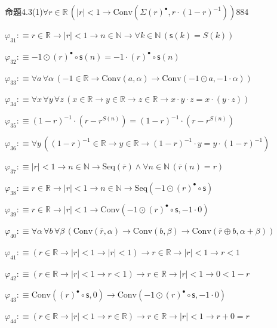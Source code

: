 \begin{fullproof}{命題4.3(1)}{$\forall r \in \mathbb{R}\,(\lvert r \rvert < 1 \to \mathrm{Conv}(\Sigma {(r)^{\bullet}},r \cdot (1 - r)^{-1}))$}{884}
\begin{abbrevlist}
\item $\varphi_{31} :\equiv r \in \mathbb{R} \to \lvert r \rvert < 1 \to n \in \mathbb{N} \to \forall k \in \mathbb{N}\,(\mathsf{s}(k) = S(k))$
\item $\varphi_{32} :\equiv -1 \odot {(r)^{\bullet}} \circ \mathsf{s}(n) = -1 \cdot {(r)^{\bullet}} \circ \mathsf{s}(n)$
\item $\varphi_{33} :\equiv \forall a\,\forall \alpha\,(-1 \in \mathbb{R} \to \mathrm{Conv}(a,\alpha) \to \mathrm{Conv}(-1 \odot a,-1 \cdot \alpha))$
\item $\varphi_{34} :\equiv \forall x\,\forall y\,\forall z\,(x \in \mathbb{R} \to y \in \mathbb{R} \to z \in \mathbb{R} \to x \cdot y \cdot z = x \cdot (y \cdot z))$
\item $\varphi_{35} :\equiv (1 - r)^{-1} \cdot (r - {{r}^{S(n)}}) = (1 - r)^{-1} \cdot (r - {{r}^{S(n)}})$
\item $\varphi_{36} :\equiv \forall y\,((1 - r)^{-1} \in \mathbb{R} \to y \in \mathbb{R} \to (1 - r)^{-1} \cdot y = y \cdot (1 - r)^{-1})$
\item $\varphi_{37} :\equiv \lvert r \rvert < 1 \to n \in \mathbb{N} \to \mathrm{Seq}(\overline{r}) \land \forall n \in \mathbb{N}\,(\overline{r}(n) = r)$
\item $\varphi_{38} :\equiv r \in \mathbb{R} \to \lvert r \rvert < 1 \to n \in \mathbb{N} \to \mathrm{Seq}(-1 \odot {(r)^{\bullet}} \circ \mathsf{s})$
\item $\varphi_{39} :\equiv r \in \mathbb{R} \to \lvert r \rvert < 1 \to \mathrm{Conv}(-1 \odot {(r)^{\bullet}} \circ \mathsf{s},-1 \cdot 0)$
\item $\varphi_{40} :\equiv \forall \alpha\,\forall b\,\forall \beta\,(\mathrm{Conv}(\overline{r},\alpha) \to \mathrm{Conv}(b,\beta) \to \mathrm{Conv}(\overline{r} \oplus b,\alpha + \beta))$
\item $\varphi_{41} :\equiv (r \in \mathbb{R} \to \lvert r \rvert < 1 \to \lvert r \rvert < 1) \to r \in \mathbb{R} \to \lvert r \rvert < 1 \to r < 1$
\item $\varphi_{42} :\equiv (r \in \mathbb{R} \to \lvert r \rvert < 1 \to r < 1) \to r \in \mathbb{R} \to \lvert r \rvert < 1 \to 0 < 1 - r$
\item $\varphi_{43} :\equiv \mathrm{Conv}({(r)^{\bullet}} \circ \mathsf{s},0) \to \mathrm{Conv}(-1 \odot {(r)^{\bullet}} \circ \mathsf{s},-1 \cdot 0)$
\item $\varphi_{44} :\equiv (r \in \mathbb{R} \to \lvert r \rvert < 1 \to r \in \mathbb{R}) \to r \in \mathbb{R} \to \lvert r \rvert < 1 \to r + 0 = r$

\end{abbrevlist}
\end{fullproof}
